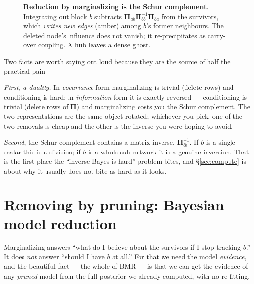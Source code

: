 \documentclass[11pt]{article}
\newcommand{\Prec}{\bm{\Pi}}        %
\theoremstyle{definition}
\begin{document}
\begin{figure}[ht]
\caption{\textbf{Reduction by marginalizing is the Schur complement.}
Integrating out block $b$ subtracts $\Prec_{ab}\Prec_{bb}^{-1}\Prec_{ba}$
from the survivors, which \emph{writes new edges} (amber) among $b$'s
former neighbours. The deleted node's influence does not vanish; it
re-precipitates as carry-over coupling. A hub leaves a dense ghost.}
\label{fig:schur}
\end{figure}

Two facts are worth saying out loud because they are the source of half
the practical pain.

\emph{First, a duality.} In \emph{covariance} form marginalizing is trivial
(delete rows) and conditioning is hard; in \emph{information} form it is
exactly reversed --- conditioning is trivial (delete rows of $\Prec$) and
marginalizing costs you the Schur complement. The two representations are
the same object rotated; whichever you pick, one of the two removals is
cheap and the other is the inverse you were hoping to avoid.

\emph{Second}, the Schur complement contains a matrix inverse,
$\Prec_{bb}^{-1}$. If $b$ is a single scalar this is a division; if $b$ is
a whole sub-network it is a genuine inversion. That is the first place the
``inverse Bayes is hard'' problem bites, and \S\ref{sec:compute} is about
why it usually does not bite as hard as it looks.

\section{Removing by pruning: Bayesian model reduction}
\label{sec:bmr}

Marginalizing answers ``what do I believe about the survivors if I stop
tracking $b$.'' It does \emph{not} answer ``should I have $b$ at all.''
For that we need the model \emph{evidence}, and the beautiful fact ---
the whole of BMR --- is that we can get the evidence of any
\emph{pruned} model from the full posterior we already computed, with no
re-fitting.
\end{document}
